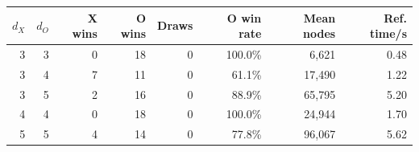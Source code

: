 \begin{tabular}{rrrrrrrr}
\toprule
$d_X$ & $d_O$ & X wins & O wins & Draws & O win rate & Mean nodes & Ref. time/s \\
\midrule
3 & 3 & 0 & 18 & 0 & 100.0\% & 6,621 & 0.48 \\
3 & 4 & 7 & 11 & 0 & 61.1\% & 17,490 & 1.22 \\
3 & 5 & 2 & 16 & 0 & 88.9\% & 65,795 & 5.20 \\
4 & 4 & 0 & 18 & 0 & 100.0\% & 24,944 & 1.70 \\
5 & 5 & 4 & 14 & 0 & 77.8\% & 96,067 & 5.62 \\
\bottomrule
\end{tabular}
